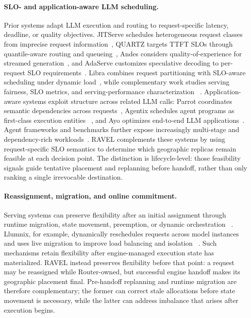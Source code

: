 \documentclass[letterpaper,twocolumn,10pt]{article}
\begin{document}
\paragraph{SLO- and application-aware LLM scheduling.}
Prior systems adapt LLM execution and routing to request-specific latency,
deadline, or quality objectives.
JITServe schedules heterogeneous request classes from imprecise request
information~\cite{jitserve}, QUARTZ targets TTFT SLOs through quantile-aware
routing and queueing~\cite{quartz}, Andes considers quality-of-experience for
streamed generation~\cite{andes}, and AdaServe customizes speculative decoding
to per-request SLO requirements~\cite{adaserve}.
Libra combines request partitioning with SLO-aware scheduling under dynamic
load~\cite{libra}, while complementary work studies serving fairness, SLO
metrics, and serving-performance characterization
~\cite{fairness_llm,revisit_slo_goodput,vidur}.
Application-aware systems exploit structure across related LLM calls:
Parrot coordinates semantic dependencies across requests~\cite{parrot},
Agentix schedules agent programs as first-class execution entities
~\cite{agentix}, and Ayo optimizes end-to-end LLM applications~\cite{ayo}.
Agent frameworks and benchmarks further expose increasingly multi-stage and
dependency-rich workloads~\cite{autogen,gaia,agentbench,webarena}.
RAVEL complements these systems by using request-specific SLO semantics to
determine which geographic replicas remain feasible at each decision point.
The distinction is lifecycle-level: those feasibility signals guide tentative
placement and replanning before handoff, rather than only ranking a single
irrevocable destination.

\paragraph{Reassignment, migration, and online commitment.}
Serving systems can preserve flexibility after an initial assignment through
runtime migration, state movement, preemption, or dynamic orchestration
~\cite{llumnix,spotserve,serverlessllm,dejavu,dlora}.
Llumnix, for example, dynamically reschedules requests across model instances
and uses live migration to improve load balancing and isolation
~\cite{llumnix}.
Such mechanisms retain flexibility after engine-managed execution state has
materialized.
RAVEL instead preserves flexibility before that point:
a request may be reassigned while Router-owned, but successful engine handoff
makes its geographic placement final.
Pre-handoff replanning and runtime migration are therefore complementary;
the former can correct stale allocations before state movement is necessary,
while the latter can address imbalance that arises after execution begins.
\end{document}
